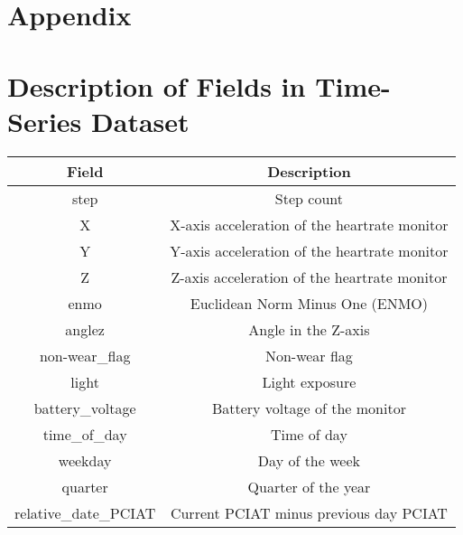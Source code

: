 \begin{appendices}
    \section*{Appendix}


    \section{Description of Fields in Time-Series Dataset}
    \begin{table}[h!]
        \centering
        \begin{tabular}{|c|c|}
        \hline
        \textbf{Field} & \textbf{Description} \\
        \hline
        step & Step count \\
        X & X-axis acceleration of the heartrate monitor \\
        Y & Y-axis acceleration of the heartrate monitor \\
        Z & Z-axis acceleration of the heartrate monitor \\
        enmo & Euclidean Norm Minus One (ENMO) \\
        anglez & Angle in the Z-axis \\
        non-wear\_flag & Non-wear flag \\
        light & Light exposure \\
        battery\_voltage & Battery voltage of the monitor \\
        time\_of\_day & Time of day \\
        weekday & Day of the week \\
        quarter & Quarter of the year \\
        relative\_date\_PCIAT & Current PCIAT minus previous day PCIAT \\
        \hline
        \end{tabular}
        \label{table:fields}
    \end{table}



\end{appendices}
